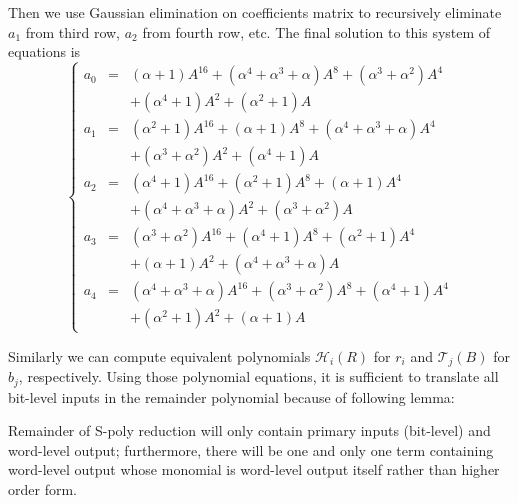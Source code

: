 \begin{Example}
Then we use Gaussian elimination on coefficients matrix 
to recursively eliminate $a_1$ from third row, $a_2$ from fourth row, etc. The final solution to this system of
equations is
\begin{displaymath}
\left\{
  \begin{array}{lcl}
  a_0 & = & (\alpha+1)A^{16}+(\alpha^4+\alpha^3+\alpha)A^8+(\alpha^3+\alpha^2)A^4\\&&+(\alpha^4+1)A^2+(\alpha^2+1)A\\
  a_1 & = & (\alpha^2+1)A^{16}+(\alpha+1)A^8+(\alpha^4+\alpha^3+\alpha)A^4\\&&+(\alpha^3+\alpha^2)A^2+(\alpha^4+1)A\\
  a_2 & = & (\alpha^4+1)A^{16}+(\alpha^2+1)A^8+(\alpha+1)A^4\\&&+(\alpha^4+\alpha^3+\alpha)A^2+(\alpha^3+\alpha^2)A\\
  a_3 & = & (\alpha^3+\alpha^2)A^{16}+(\alpha^4+1)A^8+(\alpha^2+1)A^4\\&&+(\alpha+1)A^2+(\alpha^4+\alpha^3+\alpha)A\\
  a_4 & = & (\alpha^4+\alpha^3+\alpha)A^{16}+(\alpha^3+\alpha^2)A^8+(\alpha^4+1)A^4\\&&+(\alpha^2+1)A^2+(\alpha+1)A
  \end{array} \right.
\end{displaymath}
\end{Example}
Similarly we can compute equivalent polynomials $\mathcal{H}_i(R)$ for $r_i$ and $\mathcal{T}_j(B)$ for $b_j$, respectively.
Using those polynomial equations, it is sufficient to translate all bit-level inputs in the remainder polynomial
because of following lemma:
\begin{Proposition}
\label{lem:bitlevelremainder}
Remainder of S-poly reduction will only contain primary inputs (bit-level) and word-level output; furthermore, there will be one and
only one term containing word-level output whose monomial is word-level output itself rather than higher order form.
\end{Proposition}


